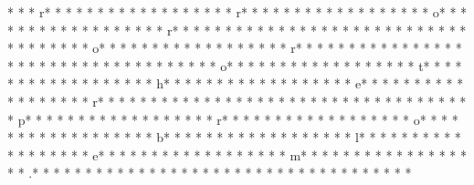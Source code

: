 * *  * r* * *  * * *  * * *  *  * * *  *  * * *  * r* * *  * * *  * * *  *  * * *  *  * * *  * o* * *  * * *  * * *  *  * * *  *  * * *  * r* * *  * * *  * * *  *  * * *  *  * * *  *  * * *  * * *  * * *  *  * * *  *  * * *  * o* * *  * * *  * * *  *  * * *  *  * * *  * r* * *  * * *  * * *  *  * * *  *  * * *  *  * * *  * * *  * * *  *  * * *  *  * * *  * o* * *  * * *  * * *  *  * * *  *  * * *  * t* * *  * * *  * * *  *  * * *  *  * * *  * h* * *  * * *  * * *  *  * * *  *  * * *  * e* * *  * * *  * * *  *  * * *  *  * * *  * r* * *  * * *  * * *  *  * * *  *  * * *  *  * * *  * * *  * * *  *  * * *  *  * * *  * p* * *  * * *  * * *  *  * * *  *  * * *  * r* * *  * * *  * * *  *  * * *  *  * * *  * o* * *  * * *  * * *  *  * * *  *  * * *  * b* * *  * * *  * * *  *  * * *  *  * * *  * l* * *  * * *  * * *  *  * * *  *  * * *  * e* * *  * * *  * * *  *  * * *  *  * * *  * m* * *  * * *  * * *  *  * * *  *  * * *  * .* * *  * * *  * * *  *  * * *  *  * * *  *  * * *  * * *  * * *  *  * * *  *  * * *  * 
